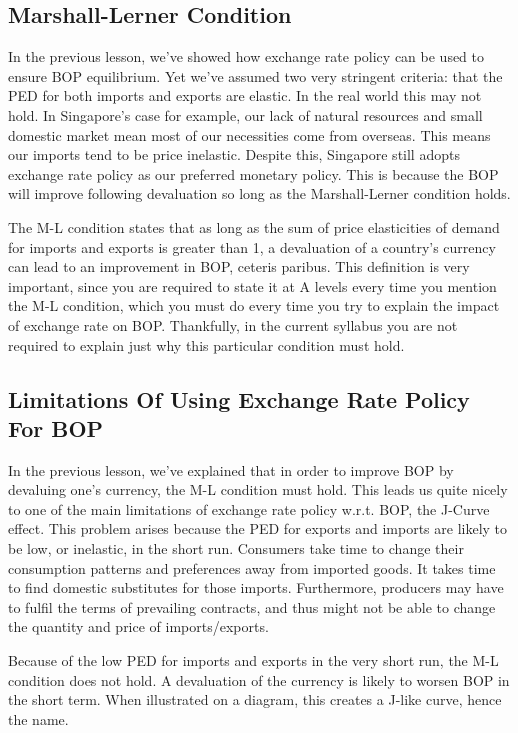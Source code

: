 \documentclass[DIV=calc,11pt,parskip,numbers=noenddot]{scrartcl} %
\begin{document}
\subsection{Marshall-Lerner Condition}
In the previous lesson, we’ve showed how exchange rate policy can be used to ensure BOP equilibrium. Yet we’ve assumed two very stringent criteria: that the PED for both imports and exports are elastic. In the real world this may not hold. In Singapore’s case for example, our lack of natural resources and small domestic market mean most of our necessities come from overseas. This means our imports tend to be price inelastic. Despite this, Singapore still adopts exchange rate policy as our preferred monetary policy. This is because the BOP will improve following devaluation so long as the Marshall-Lerner condition holds.

The M-L condition states that as long as the sum of price elasticities of demand for imports and exports is greater than 1, a devaluation of a country’s currency can lead to an improvement in BOP, ceteris paribus. This definition is very important, since you are required to state it at A levels every time you mention the M-L condition, which you must do every time you try to explain the impact of exchange rate on BOP. Thankfully, in the current syllabus you are not required to explain just why this particular condition must hold.
\subsection{Limitations Of Using Exchange Rate Policy For BOP}
In the previous lesson, we’ve explained that in order to improve BOP by devaluing one’s currency, the M-L condition must hold. This leads us quite nicely to one of the main limitations of exchange rate policy w.r.t. BOP, the J-Curve effect. This problem arises because the PED for exports and imports are likely to be low, or inelastic, in the short run. Consumers take time to change their consumption patterns and preferences away from imported goods. It takes time to find domestic substitutes for those imports. Furthermore, producers may have to fulfil the terms of prevailing contracts, and thus might not be able to change the quantity and price of imports/exports.

Because of the low PED for imports and exports in the very short run, the M-L condition does not hold. A devaluation of the currency is likely to worsen BOP in the short term. When illustrated on a diagram, this creates a J-like curve, hence the name.
\end{document}
